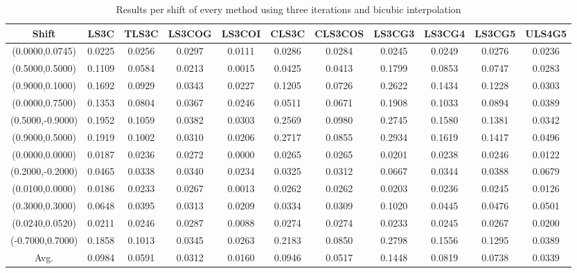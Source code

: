 \begin{table}[ht!]
\centering
\begin{tabular}{c|c|c|c|c|c|c|c|c|c|c}
Shift & \scriptsize{LS3C} & \scriptsize{TLS3C} & \scriptsize{LS3COG} & \scriptsize{LS3COI} & \scriptsize{CLS3C} & \scriptsize{CLS3COS} & \scriptsize{LS3CG3} & \scriptsize{LS3CG4} & \scriptsize{LS3CG5} & \scriptsize{ULS4G5}\\ \hline 
(0.0000,0.0745) & 0.0225 & 0.0256 & 0.0297 & 0.0111 & 0.0286 & 0.0284 & 0.0245 & 0.0249 & 0.0276 & 0.0236 \\ \hline
(0.5000,0.5000) & 0.1109 & 0.0584 & 0.0213 & 0.0015 & 0.0425 & 0.0413 & 0.1799 & 0.0853 & 0.0747 & 0.0283 \\ \hline
(0.9000,0.1000) & 0.1692 & 0.0929 & 0.0343 & 0.0227 & 0.1205 & 0.0726 & 0.2622 & 0.1434 & 0.1228 & 0.0303 \\ \hline
(0.0000,0.7500) & 0.1353 & 0.0804 & 0.0367 & 0.0246 & 0.0511 & 0.0671 & 0.1908 & 0.1033 & 0.0894 & 0.0389 \\ \hline
(0.5000,-0.9000) & 0.1952 & 0.1059 & 0.0382 & 0.0303 & 0.2569 & 0.0980 & 0.2745 & 0.1580 & 0.1381 & 0.0342 \\ \hline
(0.9000,0.5000) & 0.1919 & 0.1002 & 0.0310 & 0.0206 & 0.2717 & 0.0855 & 0.2934 & 0.1619 & 0.1417 & 0.0496 \\ \hline
(0.0000,0.0000) & 0.0187 & 0.0236 & 0.0272 & 0.0000 & 0.0265 & 0.0265 & 0.0201 & 0.0238 & 0.0246 & 0.0122 \\ \hline
(0.2000,-0.2000) & 0.0465 & 0.0338 & 0.0340 & 0.0234 & 0.0325 & 0.0312 & 0.0667 & 0.0344 & 0.0388 & 0.0679 \\ \hline
(0.0100,0.0000) & 0.0186 & 0.0233 & 0.0267 & 0.0013 & 0.0262 & 0.0262 & 0.0203 & 0.0236 & 0.0245 & 0.0126 \\ \hline
(0.3000,0.3000) & 0.0648 & 0.0395 & 0.0313 & 0.0209 & 0.0334 & 0.0309 & 0.1020 & 0.0445 & 0.0476 & 0.0501 \\ \hline
(0.0240,0.0520) & 0.0211 & 0.0246 & 0.0287 & 0.0088 & 0.0274 & 0.0274 & 0.0233 & 0.0245 & 0.0267 & 0.0200 \\ \hline
(-0.7000,0.7000) & 0.1858 & 0.1013 & 0.0345 & 0.0263 & 0.2183 & 0.0850 & 0.2798 & 0.1556 & 0.1295 & 0.0389 \\ \hline
Avg.  & 0.0984 & 0.0591 & 0.0312 & 0.0160 & 0.0946 & 0.0517 & 0.1448 & 0.0819 & 0.0738 & 0.0339 \\ \hline
\end{tabular}
\caption{Results per shift of every method using three  iterations and bicubic interpolation}
\label{tab:3itCperShift}
\end{table}


